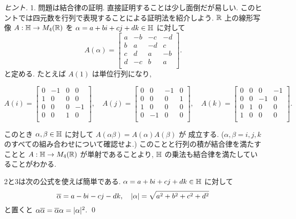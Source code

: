 \documentclass[12pt,twoside]{jarticle}
\begin{document}
\begin{proof}[ヒント]
 1. 問題は結合律の証明. 直接証明することは少し面倒だが易しい.
 このヒントでは四元数を行列で表現することによる証明法を紹介しよう.
 ${\mathbb R}$ 上の線形写像 $A:{\mathbb H}\to M_4({\mathbb R})$ を $\alpha=a+bi+cj+dk\in{\mathbb H}$ に対して
 \begin{equation*}
  A(\alpha) = 
  \left[
  \begin{array}{rrrr}
   a & -b & -c & -d \\
   b &  a & -d &  c \\
   c &  d &  a & -b \\
   d & -c &  b &  a \\
  \end{array}
  \right].
 \end{equation*}
 と定める.  たとえば $A(1)$ は単位行列になり, 
 \begin{small}
 \begin{equation*}
  A(i)=
  \left[
  \begin{array}{rrrr}
   0 & -1 &  0 &  0 \\
   1 &  0 &  0 &  0 \\
   0 &  0 &  0 & -1 \\
   0 &  0 &  1 &  0 \\
  \end{array}
  \right],
  \quad
  A(j) = 
  \left[
  \begin{array}{rrrr}
   0 &  0 & -1 &  0 \\
   0 &  0 &  0 &  1 \\
   1 &  0 &  0 &  0 \\
   0 & -1 &  0 &  0 \\
  \end{array}
  \right],
  \quad
  A(k) = 
  \left[
  \begin{array}{rrrr}
   0 &  0 &  0 & -1 \\
   0 &  0 & -1 &  0 \\
   0 &  1 &  0 &  0 \\
   1 &  0 &  0 &  0 \\
  \end{array}
  \right].
 \end{equation*}
 \end{small}%
 このとき $\alpha,\beta\in{\mathbb H}$ に対して $A(\alpha\beta)=A(\alpha)A(\beta)$ が
 成立する. ($\alpha,\beta=i,j,k$ のすべての組み合わせについて確認せよ.)
 このことと行列の積が結合律を満たすことと $A:{\mathbb H}\to M_4({\mathbb R})$
 が単射であることより, ${\mathbb H}$ の乗法も結合律を満たしていることがわかる.

 2と3は次の公式を使えば簡単である. 
 $\alpha = a + bi + cj + dk\in{\mathbb H}$ に対して
 \begin{equation*}
  \overline{\alpha} = a - bi - cj - dk, \quad
  |\alpha| = \sqrt{a^2+b^2+c^2+d^2}
 \end{equation*}
 と置くと $\alpha\overline{\alpha}=\overline{\alpha}\alpha=|\alpha|^2$.
 \qed
\end{proof}
\end{document}
